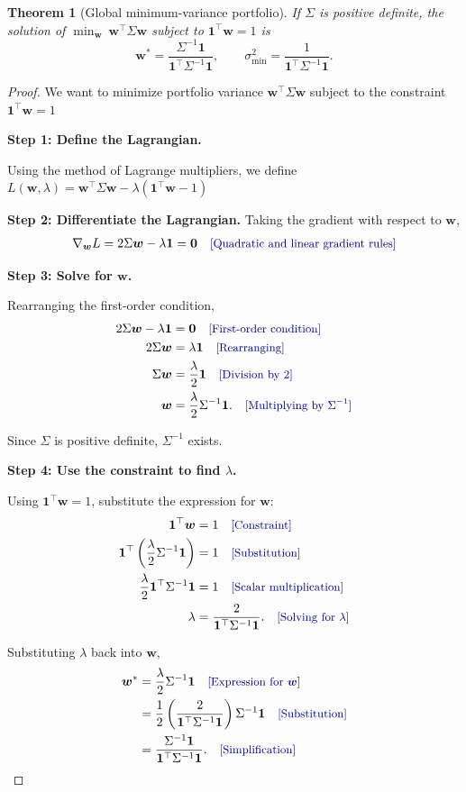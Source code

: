 \documentclass[11pt]{article}
\theoremstyle{plain}
\newtheorem{theorem}{Theorem}
\theoremstyle{definition}
\newcommand{\one}{\mathbf{1}}
\newcommand{\w}{\bm{w}}
\newcommand{\by}[1]{\quad\text{\small\color{blue!60!black}[#1]}}   %
\begin{document}
\begin{theorem}[Global minimum-variance portfolio]\label{thm:q3}
If $\Sigma$ is positive definite, the solution of $\min_{\w}\ \w^\top\Sigma\w$ subject to $\one^\top\w=1$ is
\[
\w^* = \frac{\Sigma^{-1}\one}{\one^\top\Sigma^{-1}\one}, \qquad \sigma^2_{\min} = \frac{1}{\one^\top\Sigma^{-1}\one}.
\]
\end{theorem}
\begin{proof}
We want to minimize portfolio variance
$\w^\top\Sigma\w$ subject to the constraint
$\one^\top\w=1$

\textbf{Step 1: Define the Lagrangian.}

Using the method of Lagrange multipliers, we define
$L(\w,\lambda)=\w^\top\Sigma\w-\lambda(\one^\top\w-1)$

\textbf{Step 2: Differentiate the Lagrangian.}
Taking the gradient with respect to $\w$,
\begin{align*}
\nabla_{\w}L
=2\Sigma\w-\lambda\one
&=\bm 0
\by{Quadratic and linear gradient rules}\\
\end{align*}

\textbf{Step 3: Solve for $\w$.}

Rearranging the first-order condition,
\begin{align*}
2\Sigma\w-\lambda\one
&= \bm0
\by{First-order condition}\\
2\Sigma\w
&=\lambda\one
\by{Rearranging}\\
\Sigma\w
&=\frac{\lambda}{2}\one
\by{Division by 2}\\
\w
&=\frac{\lambda}{2}\Sigma^{-1}\one.
\by{Multiplying by $\Sigma^{-1}$}
\end{align*}

Since $\Sigma$ is positive definite,
$\Sigma^{-1}$ exists.

\textbf{Step 4: Use the constraint to find $\lambda$.}

Using $\one^\top\w=1$, substitute the expression
for $\w$:
\begin{align*}
\one^\top\w
&=1
\by{Constraint}\\
\one^\top\left(
\frac{\lambda}{2}\Sigma^{-1}\one
\right)
&=1
\by{Substitution}\\
\frac{\lambda}{2}
\one^\top\Sigma^{-1}\one
&=1
\by{Scalar multiplication}\\
\lambda
&=\frac{2}{\one^\top\Sigma^{-1}\one}.
\by{Solving for $\lambda$}
\end{align*}

Substituting $\lambda$ back into $\w$,
\begin{align*}
\w^*
&=\frac{\lambda}{2}\Sigma^{-1}\one
\by{Expression for $\w$}\\
&=\frac{1}{2}
\left(\frac{2}{\one^\top\Sigma^{-1}\one}\right)
\Sigma^{-1}\one
\by{Substitution}\\
&=\frac{\Sigma^{-1}\one}
{\one^\top\Sigma^{-1}\one}.
\by{Simplification}
\end{align*}


\end{proof}
\end{document}
